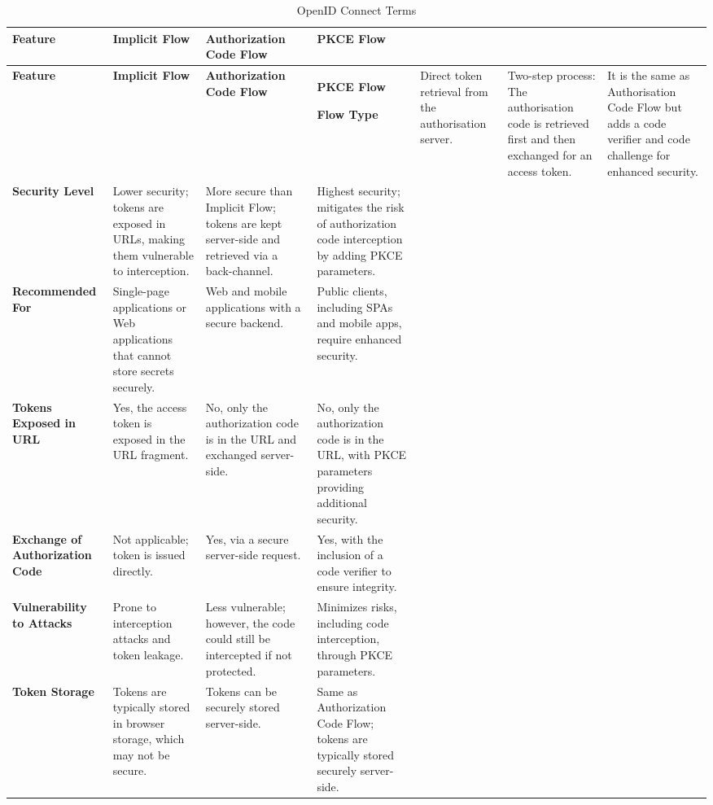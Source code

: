 \begin{longtable}{|>{\raggedright\arraybackslash}p{4cm}|>{\raggedright\arraybackslash}p{3.5cm}|>{\raggedright\arraybackslash}p{3.5cm}|>{\raggedright\arraybackslash}p{3.5cm}|}
    \caption{OpenID Connect Terms}
    \label{table:oauth_terms}
\hline
{}
\textbf{Feature} & \textbf{Implicit Flow} & \textbf{Authorization Code Flow} & \textbf{PKCE Flow} \\ \hline
\endfirsthead
\hline
{}
\textbf{Feature} & \textbf{Implicit Flow} & \textbf{Authorization Code Flow} & \textbf{PKCE Flow} 
\endhead
\hline
\endfoot
\hline
\endlastfoot

\textbf{Flow Type} & Direct token retrieval from the authorisation server. & Two-step process: The authorisation code is retrieved first and then exchanged for an access token. & It is the same as Authorisation Code Flow but adds a code verifier and code challenge for enhanced security. \\ \hline
\textbf{Security Level} & Lower security; tokens are exposed in URLs, making them vulnerable to interception. & More secure than Implicit Flow; tokens are kept server-side and retrieved via a back-channel. & Highest security; mitigates the risk of authorization code interception by adding PKCE parameters. \\ \hline
\textbf{Recommended For} & Single-page applications or Web applications that cannot store secrets securely. & Web and mobile applications with a secure backend. & Public clients, including SPAs and mobile apps, require enhanced security. \\ \hline
\textbf{Tokens Exposed in URL} & Yes, the access token is exposed in the URL fragment. & No, only the authorization code is in the URL and exchanged server-side. & No, only the authorization code is in the URL, with PKCE parameters providing additional security. \\ \hline
\textbf{Exchange of Authorization Code} & Not applicable; token is issued directly. & Yes, via a secure server-side request. & Yes, with the inclusion of a code verifier to ensure integrity. \\ \hline
\textbf{Vulnerability to Attacks} & Prone to interception attacks and token leakage. & Less vulnerable; however, the code could still be intercepted if not protected. & Minimizes risks, including code interception, through PKCE parameters. \\ \hline
\textbf{Token Storage} & Tokens are typically stored in browser storage, which may not be secure. & Tokens can be securely stored server-side. & Same as Authorization Code Flow; tokens are typically stored securely server-side. \\ \hline
\end{longtable}
\endgroup

